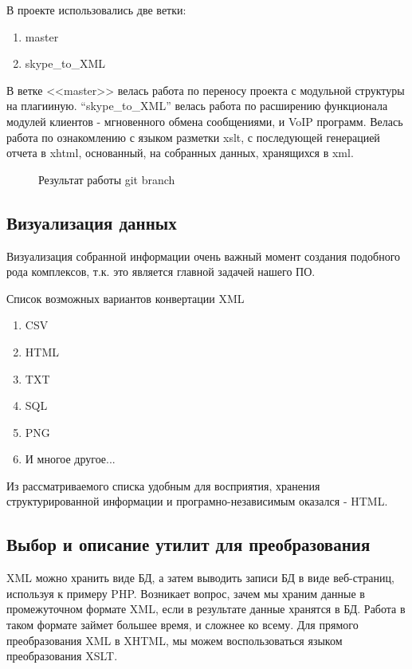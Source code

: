 В проекте использовались две ветки:

\begin{enumerate}
\item master
\item skype\_to\_XML
\end{enumerate}

 В ветке <<master>> велась работа по переносу проекта с модульной структуры на плагииную. ``skype\_to\_XML'' велась работа по расширению функционала модулей клиентов - мгновенного обмена сообщениями, и VoIP программ. Велась работа по ознакомлению с языком разметки xslt, с последующей генерацией отчета в xhtml, основанный, на собранных данных, хранящихся в xml.

\begin{figure}[ht]
\caption{Результат работы git branch}
\label{pic:branch_project}
\end{figure}

\subsection{Визуализация данных}
Визуализация собранной информации очень важный момент создания подобного рода комплексов, т.к. это является главной задачей нашего ПО. 

Список возможных вариантов конвертации XML
\begin{enumerate}
\item CSV
\item HTML
\item TXT
\item SQL

\item PNG
\item И многое другое...
\end{enumerate}

Из рассматриваемого списка удобным для восприятия, хранения структурированной информации и 
програмно-независимым%
оказался - HTML.

\subsection{Выбор и описание утилит для преобразования}

XML можно хранить виде БД, а затем выводить записи БД в виде веб-страниц, используя к примеру PHP. Возникает вопрос, зачем мы храним данные в промежуточном формате XML, если в результате данные хранятся в БД. Работа в таком формате займет большее время, и сложнее ко всему. Для прямого преобразования XML в XHTML, мы можем воспользоваться языком преобразования XSLT. 

